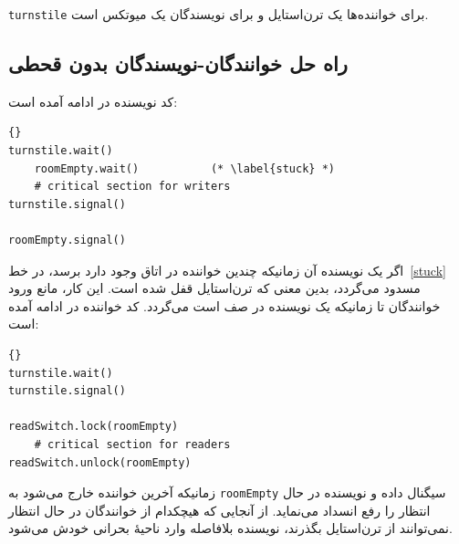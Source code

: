 \documentclass{book}
\newcommand{\clearemptydoublepage}{\newpage\cleardoublepage}
\begin{document}
    {\tt turnstile}
    برای خواننده‌ها یک ترن‌استایل  و برای نویسندگان یک میوتکس است. 


\clearemptydoublepage
\subsection{راه حل خوانندگان-نویسندگان بدون قحطی}  

    کد نویسنده در ادامه آمده است: 

\begin{latin}
\begin{lstlisting}[title=\rl{راه حل نویسنده بدون قحطی}]{}
turnstile.wait()
    roomEmpty.wait()           (* \label{stuck} *)
    # critical section for writers
turnstile.signal()

roomEmpty.signal()
\end{lstlisting}
\end{latin}

    اگر یک نویسنده آن زمانیکه چندین خواننده در اتاق وجود دارد برسد، در خط~\ref{stuck} مسدود می‌گردد، بدین معنی که ترن‌استایل قفل شده است. 
    این کار، مانع ورود خوانندگان تا زمانیکه یک نویسنده در صف است می‌گردد. کد خواننده در ادامه آمده است: 

\begin{latin}
\begin{lstlisting}[title=\rl{راه حل خواننده بدون قحطی}]{}
turnstile.wait()
turnstile.signal()

readSwitch.lock(roomEmpty)
    # critical section for readers
readSwitch.unlock(roomEmpty)
\end{lstlisting}
\end{latin}

    زمانیکه آخرین خواننده خارج می‌شود به {\tt roomEmpty} سیگنال داده و نویسنده در حال انتظار را رفع انسداد می‌نماید. 
    از آنجایی که هیچکدام از خوانندگان در حال انتظار نمی‌توانند از ترن‌استایل بگذرند، نویسنده بلافاصله وارد ناحیهٔ بحرانی خودش می‌شود. 
\end{document}

